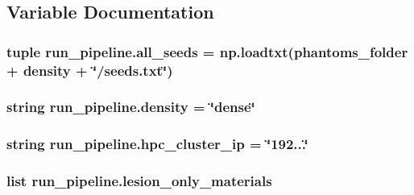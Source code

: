 \subsection{Variable Documentation}
\hypertarget{namespacerun__pipeline_a15bae38d22aeec6a0d47fa8cade55406}{
\subsubsection[{all\-\_\-seeds}]{\setlength{\rightskip}{0pt plus 5cm}tuple run\-\_\-pipeline.\-all\-\_\-seeds = np.\-loadtxt({\bf phantoms\-\_\-folder} + {\bf density} + \char`\"{}/seeds.\-txt\char`\"{})}}\label{namespacerun__pipeline_a15bae38d22aeec6a0d47fa8cade55406}
\hypertarget{namespacerun__pipeline_ae61cb02024dfca7d93506ffb8033e069}{
\subsubsection[{density}]{\setlength{\rightskip}{0pt plus 5cm}string run\-\_\-pipeline.\-density = \char`\"{}dense\char`\"{}}}\label{namespacerun__pipeline_ae61cb02024dfca7d93506ffb8033e069}
\hypertarget{namespacerun__pipeline_aa14c4b2755be317ff6b122e4e340e3ad}{
\subsubsection[{hpc\-\_\-cluster\-\_\-ip}]{\setlength{\rightskip}{0pt plus 5cm}string run\-\_\-pipeline.\-hpc\-\_\-cluster\-\_\-ip = \char`\"{}192...\char`\"{}}}\label{namespacerun__pipeline_aa14c4b2755be317ff6b122e4e340e3ad}
\hypertarget{namespacerun__pipeline_ae33763f2d174b8a12c1a4d6de9c514d3}{
\subsubsection[{lesion\-\_\-only\-\_\-materials}]{\setlength{\rightskip}{0pt plus 5cm}list run\-\_\-pipeline.\-lesion\-\_\-only\-\_\-materials}}\label{namespacerun__pipeline_ae33763f2d174b8a12c1a4d6de9c514d3}
